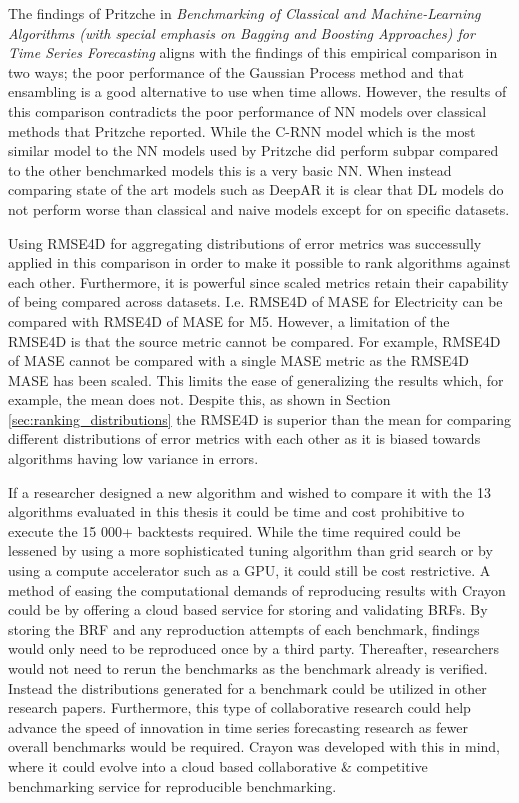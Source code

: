 The findings of Pritzche in \textit{Benchmarking of Classical and Machine-Learning Algorithms (with special emphasis on Bagging and Boosting Approaches) for Time Series Forecasting} aligns with the findings of this empirical comparison in two ways; the poor performance of the Gaussian Process method and that ensambling is a good alternative to use when time allows. However, the results of this comparison contradicts the poor performance of NN models over classical methods that Pritzche reported. While the C-RNN model which is the most similar model to the NN models used by Pritzche did perform subpar compared to the other benchmarked models this is a very basic NN. When instead comparing state of the art models such as DeepAR it is clear that DL models do not perform worse than classical and naive models except for on specific datasets.

Using RMSE4D for aggregating distributions of error metrics was successully applied in this comparison in order to make it possible to rank algorithms against each other. Furthermore, it is powerful since scaled metrics retain their capability of being compared across datasets. I.e. RMSE4D of MASE for Electricity can be compared with RMSE4D of MASE for M5. However, a limitation of the RMSE4D is that the source metric cannot be compared. For example, RMSE4D of MASE cannot be compared with a single MASE metric as the RMSE4D MASE has been scaled. This limits the ease of generalizing the results which, for example, the mean does not. Despite this, as shown in Section \ref{sec:ranking_distributions} the RMSE4D is superior than the mean for comparing different distributions of error metrics with each other as it is biased towards algorithms having low variance in errors.

If a researcher designed a new algorithm and wished to compare it with the 13 algorithms evaluated in this thesis it could be time and cost prohibitive to execute the 15 000+ backtests required. While the time required could be lessened by using a more sophisticated tuning algorithm than grid search or by using a compute accelerator such as a GPU, it could still be cost restrictive. A method of easing the computational demands of reproducing results with Crayon could be by offering a cloud based service for storing and validating BRFs. By storing the BRF and any reproduction attempts of each benchmark, findings would only need to be reproduced once by a third party. Thereafter, researchers would not need to rerun the benchmarks as the benchmark already is verified. Instead the distributions generated for a benchmark could be utilized in other research papers. Furthermore, this type of collaborative research could help advance the speed of innovation in time series forecasting research as fewer overall benchmarks would be required. Crayon was developed with this in mind, where it could evolve into a cloud based collaborative \& competitive benchmarking service for reproducible benchmarking.
